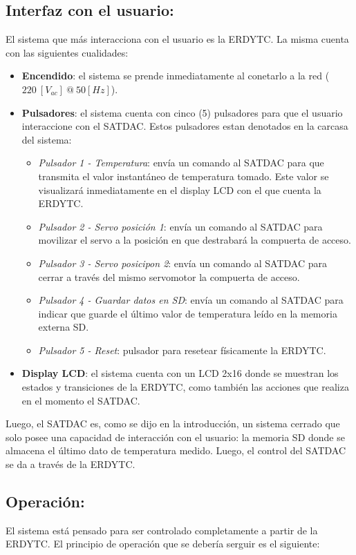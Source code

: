 \documentclass[conference]{IEEEtran}
\begin{document}
\subsection{Interfaz con el usuario:}
\label{sec:org7f1fced}
El sistema que más interacciona con el usuario es la ERDYTC. La misma cuenta con las siguientes cualidades:

\begin{itemize}
\item \textbf{Encendido}: el sistema se prende inmediatamente al conetarlo a la red (\(220 \: [V_{ac}] \: @ \: 50 [Hz]\)).
\item \textbf{Pulsadores}: el sistema cuenta con cinco (5) pulsadores para que el usuario interaccione con el SATDAC. Estos pulsadores estan denotados en la carcasa del sistema:
\begin{itemize}
\item \emph{Pulsador 1 - Temperatura}: envía un comando al SATDAC para que transmita el valor instantáneo de temperatura tomado. Este valor se visualizará inmediatamente en el display LCD con el que cuenta la ERDYTC.
\item \emph{Pulsador 2 - Servo posición 1}: envía un comando al SATDAC para movilizar el servo a la posición en que destrabará la compuerta de acceso.
\item \emph{Pulsador 3 - Servo posicipon 2}: envía un comando al SATDAC para cerrar a través del mismo servomotor la compuerta de acceso.
\item \emph{Pulsador 4 - Guardar datos en SD}: envía un comando al SATDAC para indicar que guarde el último valor de temperatura leído en la memoria externa SD.
\item \emph{Pulsador 5 - Reset}: pulsador para resetear físicamente la ERDYTC.
\end{itemize}
\item \textbf{Display LCD}: el sistema cuenta con un LCD 2x16 donde se muestran los estados y transiciones de la ERDYTC, como también las acciones que realiza en el momento el SATDAC.
\end{itemize}

Luego, el SATDAC es, como se dijo en la introducción, un sistema cerrado que solo posee una capacidad de interacción con el usuario: la memoria SD donde se almacena el último dato de temperatura medido. Luego, el control del SATDAC se da a través de la ERDYTC.

\subsection{Operación:}
\label{sec:org300d782}
El sistema está pensado para ser controlado completamente a partir de la ERDYTC. El principio de operación que se debería serguir es el siguiente:
\end{document}
